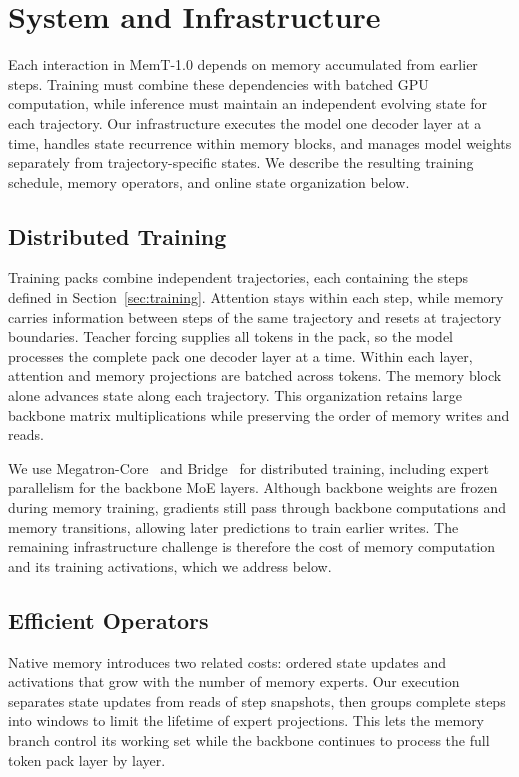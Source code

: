 \section{System and Infrastructure}
\label{sec:infra}

Each interaction in MemT-1.0 depends on memory accumulated from earlier steps.
Training must combine these dependencies with batched GPU computation, while inference must maintain an independent evolving state for each trajectory.
Our infrastructure executes the model one decoder layer at a time, handles state recurrence within memory blocks, and manages model weights separately from trajectory-specific states.
We describe the resulting training schedule, memory operators, and online state organization below.

\subsection{Distributed Training}
\label{sec:distributed_training}

Training packs combine independent trajectories, each containing the steps defined in Section~\ref{sec:training}.
Attention stays within each step, while memory carries information between steps of the same trajectory and resets at trajectory boundaries.
Teacher forcing supplies all tokens in the pack, so the model processes the complete pack one decoder layer at a time.
Within each layer, attention and memory projections are batched across tokens.
The memory block alone advances state along each trajectory.
This organization retains large backbone matrix multiplications while preserving the order of memory writes and reads.

We use Megatron-Core~\cite{narayanan2021efficientlargescalelanguagemodel} and Bridge~\cite{nvidia2026megatronbridge} for distributed training, including expert parallelism for the backbone MoE layers.
Although backbone weights are frozen during memory training, gradients still pass through backbone computations and memory transitions, allowing later predictions to train earlier writes.
The remaining infrastructure challenge is therefore the cost of memory computation and its training activations, which we address below.

\subsection{Efficient Operators}
\label{sec:infra_operators}

Native memory introduces two related costs: ordered state updates and activations that grow with the number of memory experts.
Our execution separates state updates from reads of step snapshots, then groups complete steps into windows to limit the lifetime of expert projections.
This lets the memory branch control its working set while the backbone continues to process the full token pack layer by layer.

